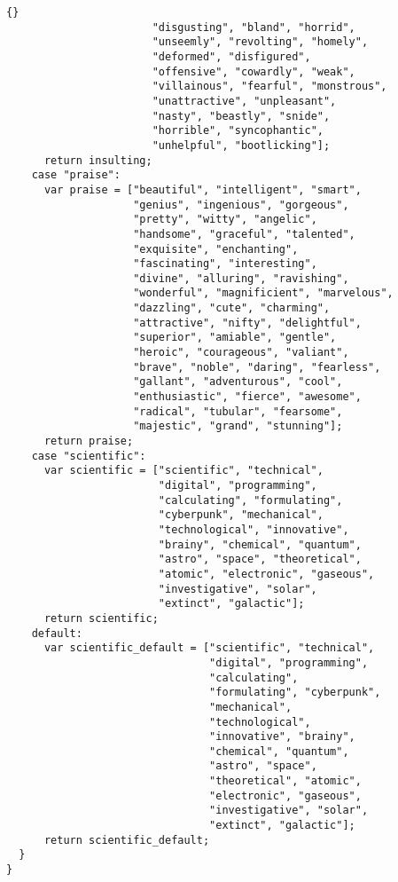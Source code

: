 \documentclass[twoside]{article}
\begin{document}
\begin{lstlisting}{}
                       "disgusting", "bland", "horrid", 
                       "unseemly", "revolting", "homely", 
                       "deformed", "disfigured", 
                       "offensive", "cowardly", "weak", 
                       "villainous", "fearful", "monstrous",
                       "unattractive", "unpleasant", 
                       "nasty", "beastly", "snide", 
                       "horrible", "syncophantic", 
                       "unhelpful", "bootlicking"];
      return insulting;
    case "praise":
      var praise = ["beautiful", "intelligent", "smart", 
                    "genius", "ingenious", "gorgeous", 
                    "pretty", "witty", "angelic", 
                    "handsome", "graceful", "talented", 
                    "exquisite", "enchanting", 
                    "fascinating", "interesting", 
                    "divine", "alluring", "ravishing", 
                    "wonderful", "magnificient", "marvelous",
                    "dazzling", "cute", "charming", 
                    "attractive", "nifty", "delightful", 
                    "superior", "amiable", "gentle", 
                    "heroic", "courageous", "valiant", 
                    "brave", "noble", "daring", "fearless", 
                    "gallant", "adventurous", "cool", 
                    "enthusiastic", "fierce", "awesome", 
                    "radical", "tubular", "fearsome", 
                    "majestic", "grand", "stunning"];
      return praise;
    case "scientific":
      var scientific = ["scientific", "technical", 
                        "digital", "programming", 
                        "calculating", "formulating", 
                        "cyberpunk", "mechanical", 
                        "technological", "innovative", 
                        "brainy", "chemical", "quantum", 
                        "astro", "space", "theoretical", 
                        "atomic", "electronic", "gaseous", 
                        "investigative", "solar", 
                        "extinct", "galactic"];
      return scientific;
    default:
      var scientific_default = ["scientific", "technical", 
                                "digital", "programming", 
                                "calculating", 
                                "formulating", "cyberpunk", 
                                "mechanical", 
                                "technological", 
                                "innovative", "brainy", 
                                "chemical", "quantum", 
                                "astro", "space", 
                                "theoretical", "atomic", 
                                "electronic", "gaseous", 
                                "investigative", "solar", 
                                "extinct", "galactic"];
      return scientific_default;
  }
}


\end{lstlisting}
\end{document}
